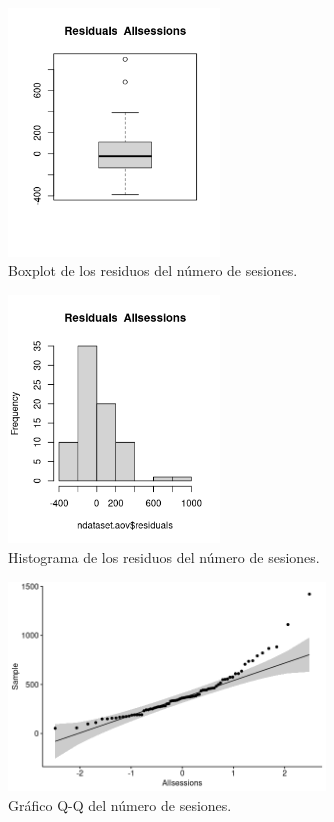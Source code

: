 \begin{figure}[H]
    \centering
    \includegraphics[width=0.50\textwidth]{imagenes/allsessions/Rplot02.png}
    \caption{Boxplot de los residuos del número de sesiones.}
    \label{fig:boxplotresiduals}
\end{figure}

\begin{figure}[H]
    \centering
    \includegraphics[width=0.50\textwidth]{imagenes/allsessions/Rplot03.png}
    \caption{Histograma de los residuos del número de sesiones.}
    \label{fig:histogramresiduals}
\end{figure}


\begin{figure}[H]
    \centering
    \includegraphics[width=0.75\textwidth]{imagenes/allsessions/Rplot05.png}
    \caption{Gráfico Q-Q del número de sesiones.}
    \label{fig:q-qsessions}
\end{figure}


